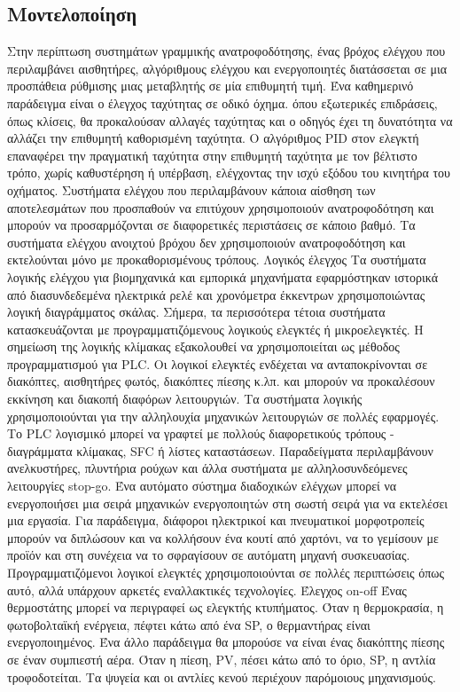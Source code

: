 \documentclass[11pt,a4paper,notitlepage,fleqn,final]{article}
\begin{document}
\subsection{Μοντελοποίηση}
Στην περίπτωση συστημάτων γραμμικής ανατροφοδότησης, ένας βρόχος ελέγχου που περιλαμβάνει αισθητήρες, αλγόριθμους ελέγχου και ενεργοποιητές διατάσσεται σε μια προσπάθεια ρύθμισης μιας μεταβλητής σε μία επιθυμητή τιμή. Ένα καθημερινό παράδειγμα είναι ο έλεγχος ταχύτητας σε οδικό όχημα. όπου εξωτερικές επιδράσεις, όπως κλίσεις, θα προκαλούσαν αλλαγές ταχύτητας και ο οδηγός έχει τη δυνατότητα να αλλάζει την επιθυμητή καθορισμένη ταχύτητα. Ο αλγόριθμος PID στον ελεγκτή επαναφέρει την πραγματική ταχύτητα στην επιθυμητή ταχύτητα με τον βέλτιστο τρόπο, χωρίς καθυστέρηση ή υπέρβαση, ελέγχοντας την ισχύ εξόδου του κινητήρα του οχήματος.
Συστήματα ελέγχου που περιλαμβάνουν κάποια αίσθηση των αποτελεσμάτων που προσπαθούν να επιτύχουν χρησιμοποιούν ανατροφοδότηση και μπορούν να προσαρμόζονται σε διαφορετικές περιστάσεις σε κάποιο βαθμό. Τα συστήματα ελέγχου ανοιχτού βρόχου δεν χρησιμοποιούν ανατροφοδότηση και εκτελούνται μόνο με προκαθορισμένους τρόπους.
Λογικός έλεγχος
Τα συστήματα λογικής ελέγχου για βιομηχανικά και εμπορικά μηχανήματα εφαρμόστηκαν ιστορικά από διασυνδεδεμένα ηλεκτρικά ρελέ και χρονόμετρα έκκεντρων χρησιμοποιώντας λογική διαγράμματος σκάλας. Σήμερα, τα περισσότερα τέτοια συστήματα κατασκευάζονται με προγραμματιζόμενους λογικούς ελεγκτές ή μικροελεγκτές. Η σημείωση της λογικής κλίμακας εξακολουθεί να χρησιμοποιείται ως μέθοδος προγραμματισμού για PLC.
Οι λογικοί ελεγκτές ενδέχεται να ανταποκρίνονται σε διακόπτες, αισθητήρες φωτός, διακόπτες πίεσης κ.λπ. και μπορούν να προκαλέσουν εκκίνηση και διακοπή διαφόρων λειτουργιών. Τα συστήματα λογικής χρησιμοποιούνται για την αλληλουχία μηχανικών λειτουργιών σε πολλές εφαρμογές. Το PLC λογισμικό μπορεί να γραφτεί με πολλούς διαφορετικούς τρόπους - διαγράμματα κλίμακας, SFC ή λίστες καταστάσεων.
Παραδείγματα περιλαμβάνουν ανελκυστήρες, πλυντήρια ρούχων και άλλα συστήματα με αλληλοσυνδεόμενες λειτουργίες stop-go. Ένα αυτόματο σύστημα διαδοχικών ελέγχων μπορεί να ενεργοποιήσει μια σειρά μηχανικών ενεργοποιητών στη σωστή σειρά για να εκτελέσει μια εργασία. Για παράδειγμα, διάφοροι ηλεκτρικοί και πνευματικοί μορφοτροπείς μπορούν να διπλώσουν και να κολλήσουν ένα κουτί από χαρτόνι, να το γεμίσουν με προϊόν και στη συνέχεια να το σφραγίσουν σε αυτόματη μηχανή συσκευασίας. Προγραμματιζόμενοι λογικοί ελεγκτές χρησιμοποιούνται σε πολλές περιπτώσεις όπως αυτό, αλλά υπάρχουν αρκετές εναλλακτικές τεχνολογίες.
Έλεγχος on-off
Ένας θερμοστάτης μπορεί να περιγραφεί ως ελεγκτής κτυπήματος. Όταν η θερμοκρασία, η φωτοβολταϊκή ενέργεια, πέφτει κάτω από ένα SP, ο θερμαντήρας είναι ενεργοποιημένος. Ένα άλλο παράδειγμα θα μπορούσε να είναι ένας διακόπτης πίεσης σε έναν συμπιεστή αέρα. Όταν η πίεση, PV, πέσει κάτω από το όριο, SP, η αντλία τροφοδοτείται. Τα ψυγεία και οι αντλίες κενού περιέχουν παρόμοιους μηχανισμούς.
\end{document}
